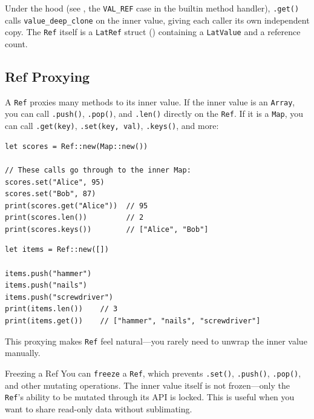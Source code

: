 Under the hood (see , the \texttt{VAL\_REF} case in the builtin method handler), \lstinline|.get()| calls \texttt{value\_deep\_clone} on the inner value, giving each caller its own independent copy.
The \lstinline|Ref| itself is a \texttt{LatRef} struct () containing a \texttt{LatValue} and a reference count.

\subsection{Ref Proxying}


A \lstinline|Ref| proxies many methods to its inner value.
If the inner value is an \lstinline|Array|, you can call \lstinline|.push()|, \lstinline|.pop()|, and \lstinline|.len()| directly on the \lstinline|Ref|.
If it is a \lstinline|Map|, you can call \lstinline|.get(key)|, \lstinline|.set(key, val)|, \lstinline|.keys()|, and more:

\begin{lstlisting}[language=Lattice, caption={Ref proxying to inner types}]
let scores = Ref::new(Map::new())

// These calls go through to the inner Map:
scores.set("Alice", 95)
scores.set("Bob", 87)
print(scores.get("Alice"))  // 95
print(scores.len())         // 2
print(scores.keys())        // ["Alice", "Bob"]
\end{lstlisting}

\begin{lstlisting}[language=Lattice, caption={Ref with Array inner type}]
let items = Ref::new([])

items.push("hammer")
items.push("nails")
items.push("screwdriver")
print(items.len())    // 3
print(items.get())    // ["hammer", "nails", "screwdriver"]
\end{lstlisting}

This proxying makes \lstinline|Ref| feel natural---you rarely need to unwrap the inner value manually.

\begin{notebox}{Freezing a Ref}
You can \lstinline|freeze| a \lstinline|Ref|, which prevents \lstinline|.set()|, \lstinline|.push()|, \lstinline|.pop()|, and other mutating operations.
The inner value itself is not frozen---only the \lstinline|Ref|'s ability to be mutated through its API is locked.
This is useful when you want to share read-only data without sublimating.
\end{notebox}

